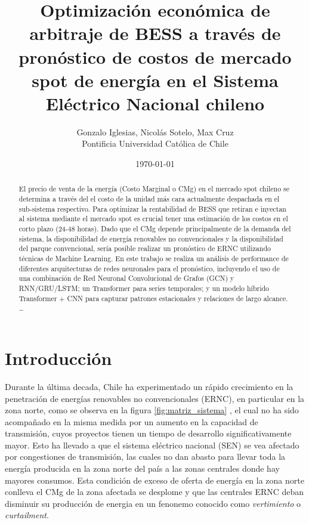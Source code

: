 \documentclass[twocolumn]{article}
\title{Optimización económica de arbitraje de BESS a través de pronóstico de 
costos de mercado spot de energía en el Sistema Eléctrico Nacional chileno}
\author{Gonzalo Iglesias, Nicolás Sotelo, Max Cruz  \\
	Pontificia Universidad Católica de Chile  \\
	}
\date{\today}
\begin{document}
\setlength{\droptitle}{-4em}     %
\addtolength{\droptitle}{-4pt}
\maketitle


\begin{abstract}
El precio de venta de la energía (Costo Marginal o CMg) en el mercado spot chileno se determina a través del 
el costo de la unidad más cara actualmente despachada en el sub-sistema respectivo.
Para optimizar la rentabilidad de BESS que retiran e inyectan al sistema mediante el mercado
spot es crucial tener una estimación de los costos en el corto plazo (24-48 horas). Dado que el CMg depende 
principalmente de la demanda del sistema, la disponibilidad de energía renovables no convencionales y la disponibilidad
del parque convencional, sería posible realizar un pronóstico de ERNC utilizando técnicas de Machine Learning.
En este trabajo se realiza un análisis de performance de diferentes arquitecturas de redes neuronales para el pronóstico, 
incluyendo el uso de una combinación de Red Neuronal Convolucional de Grafos (GCN) y
RNN/GRU/LSTM; un Transformer para series temporales; y un modelo híbrido Transformer + CNN para
capturar patrones estacionales y relaciones de largo alcance.
 \ldots
\end{abstract}

\section{Introducción}
Durante la última decada, Chile ha experimentado un rápido crecimiento en la penetración de
 energías renovables no convencionales (ERNC), en particular en la zona norte, como se observa en la figura \ref{fig:matriz_sistema}
 , el cual no ha sido acompañado en la misma medida por un aumento
 en la capacidad de transmisión, cuyos proyectos tienen un tiempo de desarrollo significativamente mayor.
 Esto ha llevado a que el sistema eléctrico nacional (SEN) se vea afectado por congestiones de transmisión, las cuales no dan 
 abasto para llevar toda la energía producida en la zona norte del país a las zonas centrales donde hay mayores consumos.
 Esta condición de exceso de oferta de energía en la zona norte conlleva el CMg de la zona afectada se desplome y que las 
 centrales ERNC deban disminuir su producción de energia en un fenonemo conocido como \textit{vertimiento} o \textit{curtailment}.
 
\end{document}

